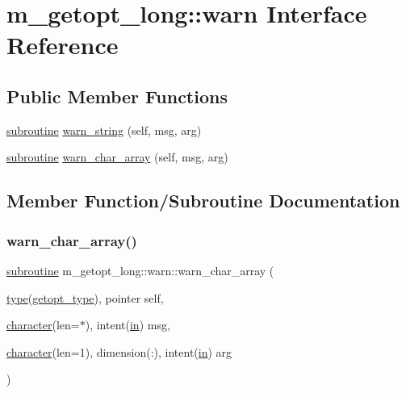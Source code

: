 \hypertarget{interfacem__getopt__long_1_1warn}{}\section{m\+\_\+getopt\+\_\+long\+:\+:warn Interface Reference}
\label{interfacem__getopt__long_1_1warn}
\subsection*{Public Member Functions}
\begin{DoxyCompactItemize}
\item 
\hyperlink{M__stopwatch_83_8txt_acfbcff50169d691ff02d4a123ed70482}{subroutine} \hyperlink{interfacem__getopt__long_1_1warn_a37d158a750e57e3aab62c50d9de4f353}{warn\+\_\+string} (self, msg, arg)
\item 
\hyperlink{M__stopwatch_83_8txt_acfbcff50169d691ff02d4a123ed70482}{subroutine} \hyperlink{interfacem__getopt__long_1_1warn_ad4dff786b11d1f766050ba15bd2d495b}{warn\+\_\+char\+\_\+array} (self, msg, arg)
\end{DoxyCompactItemize}


\subsection{Member Function/\+Subroutine Documentation}
\mbox{\label{interfacem__getopt__long_1_1warn_ad4dff786b11d1f766050ba15bd2d495b}} 
\subsubsection{\texorpdfstring{warn\+\_\+char\+\_\+array()}{warn\_char\_array()}}
{\footnotesize\ttfamily \hyperlink{M__stopwatch_83_8txt_acfbcff50169d691ff02d4a123ed70482}{subroutine} m\+\_\+getopt\+\_\+long\+::warn\+::warn\+\_\+char\+\_\+array (\begin{DoxyParamCaption}\item[{\hyperlink{stop__watch_83_8txt_a70f0ead91c32e25323c03265aa302c1c}{type}(\hyperlink{structm__getopt__long_1_1getopt__type}{getopt\+\_\+type}), pointer}]{self,  }\item[{\hyperlink{option__stopwatch_83_8txt_abd4b21fbbd175834027b5224bfe97e66}{character}(len=$\ast$), intent(\hyperlink{M__journal_83_8txt_afce72651d1eed785a2132bee863b2f38}{in})}]{msg,  }\item[{\hyperlink{option__stopwatch_83_8txt_abd4b21fbbd175834027b5224bfe97e66}{character}(len=1), dimension(\+:), intent(\hyperlink{M__journal_83_8txt_afce72651d1eed785a2132bee863b2f38}{in})}]{arg }\end{DoxyParamCaption})}

